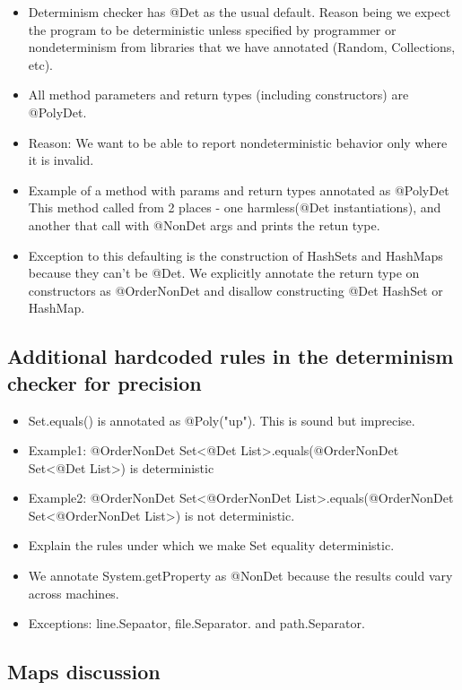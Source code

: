 \begin{itemize}
	\item Determinism checker has @Det as the usual default. Reason being we expect the program to be 
	deterministic unless specified by programmer or nondeterminism from libraries that we have annotated (Random, Collections, etc).
	\item All method parameters and return types (including constructors) are @PolyDet.
	\item Reason: We want to be able to report nondeterministic behavior only where it is invalid.
	\item Example of a method with params and return types annotated as @PolyDet
	This method called from 2 places - one harmless(@Det instantiations), and another that call with @NonDet args and prints the retun type.
	\item Exception to this defaulting is the construction of HashSets and HashMaps because they can't be @Det.
	We explicitly annotate the return type on constructors as @OrderNonDet and disallow constructing @Det HashSet or HashMap.
\end{itemize}

\subsection{Additional hardcoded rules in the determinism checker  for precision}

\begin{itemize}
	\item Set.equals() is annotated as @Poly("up"). This is sound but imprecise.
	\item Example1: @OrderNonDet Set<@Det List>.equals(@OrderNonDet Set<@Det List>) is deterministic
	\item Example2: @OrderNonDet Set<@OrderNonDet List>.equals(@OrderNonDet Set<@OrderNonDet List>) is not deterministic.
	\item Explain the rules under which we make Set equality deterministic.
	\item We annotate System.getProperty as @NonDet because the results could vary across machines.
	\item Exceptions: line.Sepaator, file.Separator. and path.Separator.
\end{itemize}

\subsection{Maps discussion}


